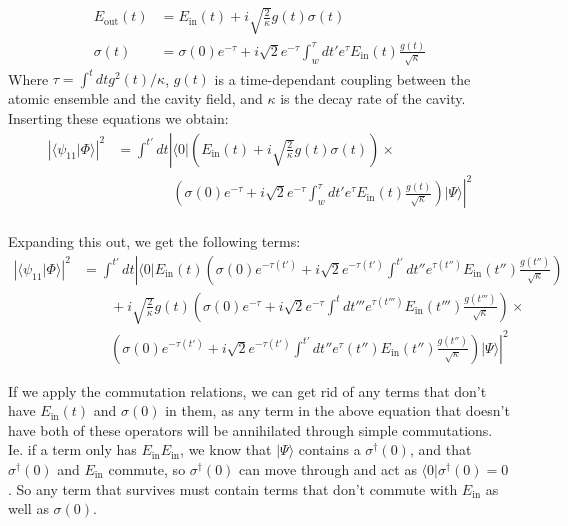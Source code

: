 \documentclass[12pt]{article}
\begin{document}
\begin{align}
E_\textrm{out}(t) &= E_\textrm{in}(t) + i \sqrt{\frac{2}{\kappa}} g(t) \sigma(t)\\
\sigma(t) &= \sigma(0) e^{-\tau} + i\sqrt{2} e^{-\tau} \int^\tau_w d t' e^\tau E_\textrm{in}(t) \frac{g(t)}{\sqrt{\kappa}}
\end{align}
Where $\tau = \int^t dt g^2(t)/\kappa$, $g(t)$ is a time-dependant coupling between the atomic ensemble and the cavity field, and $\kappa$ is the decay rate of the cavity. Inserting these equations we obtain:
\begin{align}
\left | \langle \psi_{11} | \Phi \rangle \right | ^2 &= \int^{t'} dt \left | \langle 0 |
   \left(  E_\textrm{in}(t) + i \sqrt{\frac{2}{\kappa}} g(t) \sigma(t) \right ) \times \right.\\
   &\left. \qquad \qquad \left (\sigma(0) e^{-\tau} + i\sqrt{2} e^{-\tau} \int^\tau_w d t' e^\tau E_\textrm{in}(t) \frac{g(t)}{\sqrt{\kappa}}\right)|\Psi \rangle \right |^2\\
\end{align}

Expanding this out, we get the following terms:
\begin{align}
\left | \langle \psi_{11} | \Phi \rangle \right | ^2 &= 
\int^{t'} dt \left | \langle 0 | E_\textrm{in}(t) \left( \sigma(0) e^{-\tau(t')} + i\sqrt{2} e^{-\tau(t')} \int^{t'} d t'' e^{\tau(t'')} E_\textrm{in}(t'') \frac{g(t'')}{\sqrt{\kappa}} \right )\right. \\
&\qquad+ i \sqrt{\frac{2}{\kappa}}g(t)\left (\sigma(0) e^{-\tau} + i\sqrt{2} e^{-\tau} \int^{t}d t''' e^{\tau(t''')} E_\textrm{in}(t''') \frac{g(t''')}{\sqrt{\kappa}} \right) \times\\
&\left.\qquad \left(\sigma(0) e^{-\tau(t')} + i\sqrt{2} e^{-\tau(t')} \int^{t'} d t'' e^\tau(t'') E_\textrm{in}(t'') \frac{g(t'')}{\sqrt{\kappa}}\right) | \Psi \rangle \right |^2 
\end{align}

If we apply the commutation relations, we can get rid of any terms that don't have $E_\textrm{in}(t)$ and $\sigma(0)$ in them, as any term in the above equation that doesn't have both of these operators will be annihilated through simple commutations. Ie. if a term only has $E_\textrm{in} E_\textrm{in}$, we know that $|\Psi\rangle$ contains a $\sigma^\dagger(0)$, and that $\sigma^\dagger(0)$ and $E_\textrm{in}$ commute, so $\sigma^\dagger(0)$ can move through and act as $\langle 0 | \sigma^\dagger(0) = 0$. So any term that survives must contain terms that don't commute with $E_\textrm{in}$ as well as $\sigma(0)$.
\end{document}
